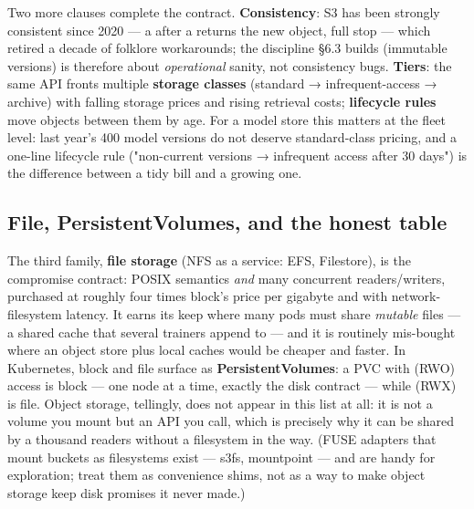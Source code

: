 Two more clauses complete the contract. \textbf{Consistency}: S3 has been strongly consistent since 2020 — a  after a  returns the new object, full stop — which retired a decade of folklore workarounds; the discipline §6.3 builds (immutable versions) is therefore about \textit{operational} sanity, not consistency bugs. \textbf{Tiers}: the same API fronts multiple \textbf{storage classes} (standard → infrequent-access → archive) with falling storage prices and rising retrieval costs; \textbf{lifecycle rules} move objects between them by age. For a model store this matters at the fleet level: last year's 400 model versions do not deserve standard-class pricing, and a one-line lifecycle rule ("non-current versions → infrequent access after 30 days") is the difference between a tidy bill and a growing one.

\subsection*{File, PersistentVolumes, and the honest table}

The third family, \textbf{file storage} (NFS as a service: EFS, Filestore), is the compromise contract: POSIX semantics \textit{and} many concurrent readers/writers, purchased at roughly four times block's price per gigabyte and with network-filesystem latency. It earns its keep where many pods must share \textit{mutable} files — a shared cache that several trainers append to — and it is routinely mis-bought where an object store plus local caches would be cheaper and faster. In Kubernetes, block and file surface as \textbf{PersistentVolumes}: a PVC with  (RWO) access is block — one node at a time, exactly the disk contract — while  (RWX) is file. Object storage, tellingly, does not appear in this list at all: it is not a volume you mount but an API you call, which is precisely why it can be shared by a thousand readers without a filesystem in the way. (FUSE adapters that mount buckets as filesystems exist — s3fs, mountpoint — and are handy for exploration; treat them as convenience shims, not as a way to make object storage keep disk promises it never made.)


